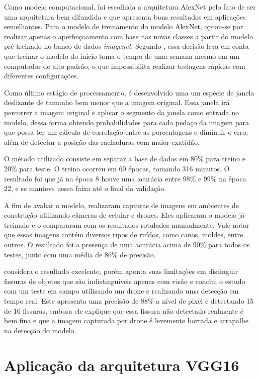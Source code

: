 Como modelo computacional, foi escolhida a arquitetura AlexNet pelo fato de ser uma arquitetura bem difundida e que apresenta bons resultados em aplicações semelhantes. 
Para o modelo de treinamento do modelo AlexNet, optou-se por realizar apenas o aperfeiçoamento com base nas novas classes a partir do modelo pré-treinado no banco de dados \textit{imagenet}.
Segundo , essa decisão leva em conta que treinar o modelo do início toma o tempo de uma semana mesmo em um computador de alto padrão, o que impossibilita realizar testagens rápidas com diferentes configurações. 

Como último estágio de processamento, é desenvolvido uma um espécie de janela deslizante de tamanho bem menor que a imagem original. 
Essa janela irá percorrer a imagem original e aplicar o segmento da janela como entrada no modelo, dessa forma obtendo probabilidades para cada pedaço da imagem para que possa ter um cálculo de correlação entre as porcentagens e diminuir o erro, além de detectar a posição das rachaduras com maior exatidão.

O método utilizado consiste em separar a base de dados em 80\% para treino e 20\% para teste.
O treino ocorreu em 60 épocas, tomando 316 minutos. 
O resultado foi que já na época 8 houve uma acurácia entre 98\% e 99\% na época 22, e se manteve nessa faixa até o final da validação.

A fim de avaliar o modelo,  realizaram capturas de imagens em ambientes de construção utilizando câmeras de celular e drones. 
Eles aplicaram o modelo já treinado e o compararam com os resultados rotulados manualmente.
Vale notar que essas imagens contém diversos tipos de ruídos, como canos, moldes, entre outros. 
O resultado foi a presença de uma acurácia acima de 90\% para todos os testes, junto com uma média de 86\% de precisão.

 considera o resultado excelente, porém aponta suas limitações em distinguir fissuras de objetos que são indistinguíveis apenas com visão e conclui o estudo com um teste em campo utilizando um drone e realizando uma detecção em tempo real.
Este apresenta uma precisão de 88\% a nível de pixel e detectando 15 de 16 fissuras, embora ele explique que essa fissura não detectada realmente é bem fina e que a imagem capturada por drone é levemente borrada e atrapalhe na detecção do modelo.


\section{Aplicação da arquitetura VGG16}

